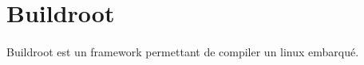 \section{Buildroot}
\paragraph{}
Buildroot est un framework permettant de compiler un linux embarqué.


